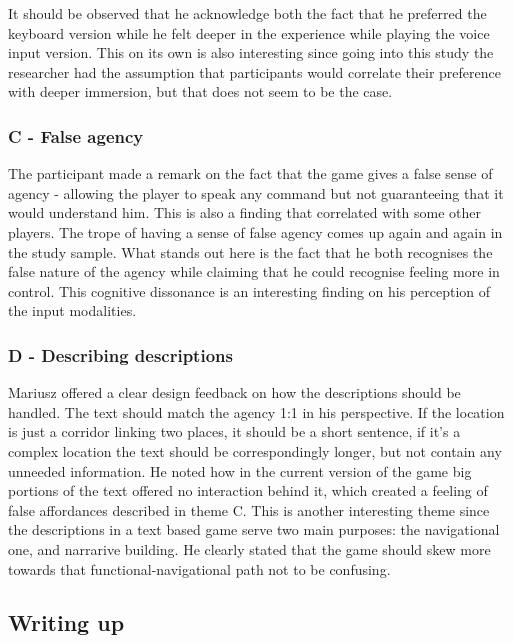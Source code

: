 It should be observed that he acknowledge both the fact that he preferred the keyboard version while he felt deeper in the experience while playing the voice input version. This on its own is also interesting since going into this study the researcher had the assumption that participants would correlate their preference with deeper immersion, but that does not seem to be the case.


\subsubsection{C - False agency}

The participant made a remark on the fact that the game gives a false sense of agency - allowing the player to speak any command but not guaranteeing that it would understand him. 
This is also a finding that correlated with some other players. The trope of having a sense of false agency comes up again and again in the study sample. What stands out here is the fact that he both recognises the false nature of the agency while claiming that he could recognise feeling more in control. This cognitive dissonance is an interesting finding on his perception of the input modalities. 




\subsubsection{D - Describing descriptions}

Mariusz offered a clear design feedback on how the descriptions should be handled. The text should match the agency 1:1 in his perspective. If the location is just a corridor linking two places, it should be a short sentence, if it's a complex location the text should be correspondingly longer, but not contain any unneeded information. He noted how in the current version of the game big portions of the text offered no interaction behind it, which created a feeling of false affordances described in theme C. This is another interesting theme since the descriptions in a text based game serve two main purposes: the navigational one, and narrarive building. He clearly stated that the game should skew more towards that functional-navigational path not to be confusing. 

\subsection{Writing up}

